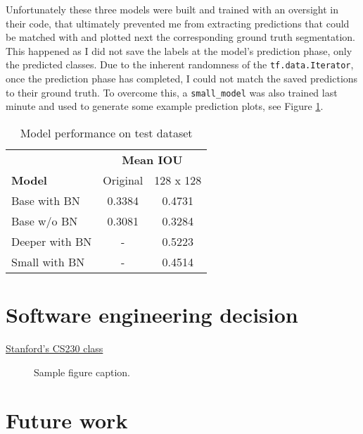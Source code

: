 \documentclass{article}
\begin{document}
Unfortunately these three models were built and trained with an oversight in their code, that ultimately prevented me from extracting predictions that could be matched with and plotted next the corresponding ground truth segmentation. This happened as I did not save the labels at the model's prediction phase, only the predicted classes. Due to the inherent randomness of the \texttt{tf.data.Iterator}, once the prediction phase has completed, I could not match the saved predictions to their ground truth. To overcome this, a \texttt{small\_model} was also trained last minute and used to generate some example prediction plots, see Figure \ref{fig:fig1}.

\begin{table}[!ht]
	\label{tab:table1}
	\centering
	\begin{tabular}{lcc}
		\toprule
		{} & \multicolumn{2}{c}{\textbf{Mean IOU}}  \\
		\cmidrule(r){2-3}
		\textbf{Model}     & Original     & 128 x 128 \\
		\midrule
		Base with BN    & 0.3384  & 0.4731  \\
		Base w/o BN     & 0.3081  & 0.3284  \\
		Deeper with BN  & -  & 0.5223  \\
		Small with BN & - & 0.4514 \\
		\bottomrule
	\end{tabular}
	\vspace{3mm}
	\caption{Model performance on test dataset}
\end{table}




\section{Software engineering decision}
\href{https://github.com/cs230-stanford/cs230-code-examples/tree/master/tensorflow/vision}{Stanford's CS230 class}


\begin{figure}[t]
	\centering
	\fbox{\rule[-.5cm]{4cm}{4cm} \rule[-.5cm]{4cm}{0cm}}
	\caption{Sample figure caption.}
	\label{fig:fig1}
\end{figure}
\section{Future work}


\printbibliography
\end{document}
